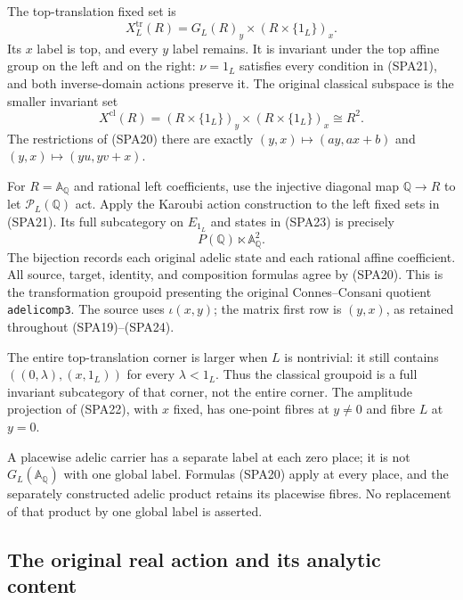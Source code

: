 The top-translation fixed set is
\begin{equation}\tag{SPA22}
X_L^{\mathrm{tr}}(R)
=G_L(R)_y\times(R\times\{1_L\})_x.
\end{equation}
Its $x$ label is top, and every $y$ label remains.
It is invariant under the top affine group on the left
and on the right: $\nu=1_L$ satisfies every condition
in (SPA21), and both inverse-domain actions preserve it.
The original classical subspace is the smaller invariant set
\begin{equation}\tag{SPA23}
X^{\mathrm{cl}}(R)
=(R\times\{1_L\})_y\times(R\times\{1_L\})_x
\cong R^2.
\end{equation}
The restrictions of (SPA20) there are exactly
$(y,x)\mapsto(ay,ax+b)$ and
$(y,x)\mapsto(yu,yv+x)$.

For $R=\mathbb A_{\mathbb Q}$ and rational left coefficients,
use the injective diagonal map $\mathbb Q\to R$ to let
$\mathcal P_L(\mathbb Q)$ act. Apply the Karoubi action
construction to the left fixed sets in (SPA21).
Its full subcategory on $E_{1_L}$ and states in (SPA23) is
precisely
\begin{equation}\tag{SPA24}
P(\mathbb Q)\ltimes\mathbb A_{\mathbb Q}^2.
\end{equation}
The bijection records each original adelic state and each
rational affine coefficient. All source, target, identity,
and composition formulas agree by (SPA20). This is the
transformation groupoid presenting the original
Connes--Consani quotient \texttt{adelicomp3}.
The source uses $\iota(x,y)$; the matrix first row is
$(y,x)$, as retained throughout (SPA19)--(SPA24).

The entire top-translation corner is larger when $L$ is
nontrivial: it still contains
$((0,\lambda),(x,1_L))$ for every $\lambda<1_L$.
Thus the classical groupoid is a full invariant subcategory
of that corner, not the entire corner.
The amplitude projection of (SPA22), with $x$ fixed, has
one-point fibres at $y\ne0$ and fibre $L$ at $y=0$.

A placewise adelic carrier has a separate label at each
zero place; it is not $G_L(\mathbb A_{\mathbb Q})$ with
one global label. Formulas (SPA20) apply at every place,
and the separately constructed adelic product retains its
placewise fibres. No replacement of that product by one
global label is asserted.

\subsection{The original real action and its analytic content}


